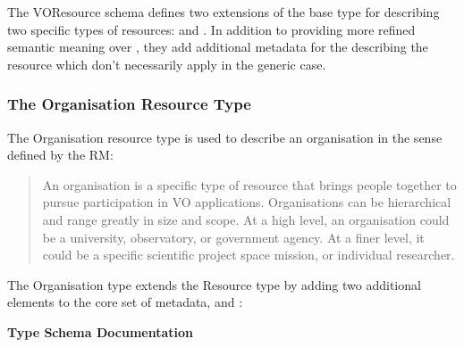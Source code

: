 \documentclass[11pt,a4paper]{ivoa}
\begin{document}
The VOResource schema defines two extensions of the base
 type for describing two specific types of
resources:   and .  In
addition to providing more refined semantic meaning over
, they add additional metadata for the
describing the resource which don't necessarily apply in the generic
case. 



\subsubsection{The Organisation Resource Type}


The Organisation resource type is used to describe an organisation in
the sense defined by the RM:


\begin{quotation}
An organisation is a specific type of resource that brings people
together to pursue participation in VO applications.  Organisations
can be hierarchical and range greatly in size and scope.  At a high
level, an organisation could be a university, observatory, or
government agency.  At a finer level, it could be a specific
scientific project space mission, or individual researcher.  
\end{quotation}


The Organisation type extends the Resource type by adding two additional
elements to the core set of metadata,  and
:


\begingroup
      	\renewcommand*\descriptionlabel[1]{%
      	\hbox to 5.5em{\emph{#1}\hfil}}\vspace{2ex}\noindent\textbf{ Type Schema Documentation}


\end{document}
